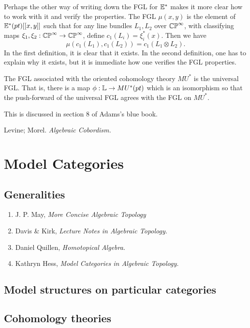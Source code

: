 \documentclass{article}%
\begin{document}
Perhaps the other way of writing down the FGL for $\mathbb{E}^*$ makes it
more clear how to work with it and verify the properties. The FGL
$\mu(x,y)$ is the element of $\mathbb{E}^*(pt)[[x,y]]$ such that for any
line bundles $L_1,L_2$ over $\mathbb{CP}^{\infty}$, with classifying maps
$\xi_1,\xi_2 : \mathbb{CP}^{\infty} \rightarrow \mathbb{CP}^{\infty}$, define
$c_1(L_i)= \xi_i^*(x)$. Then we have
\begin{equation*}
\mu(c_1(L_1),c_1(L_2)) = c_1(L_1\otimes L_2). 
\end{equation*}
In the first definition, it is clear that it exists. In the second
definition, one has to explain why it exists, but it is immediate how
one verifies the FGL properties. 

\begin{theorem}
The FGL associated with the oriented cohomology theory $MU^*$ is the
universal FGL. That is, there is a map $\phi : \mathbb{L} \rightarrow
MU^*(pt)$ which is an isomorphism so that the push-forward of the
universal FGL agrees with the FGL on $MU^*$. 
\end{theorem}

This is discussed in section 8 of Adams's blue book.


Levine; Morel. {\it Algebraic Cobordism.}


\section{Model Categories}
\subsection{Generalities}

\begin{enumerate}
\item J. P. May, {\it More Concise Algebraic Topology}
\item Davis \& Kirk, {\it Lecture Notes in Algebraic Topology.}
\item Daniel Quillen, {\it Homotopical Algebra.}
\item Kathryn Hess, {\it Model Categories in Algebraic Topology.}
\end{enumerate}

\subsection{Model structures on particular categories}

\subsection{Cohomology theories}
\end{document}
